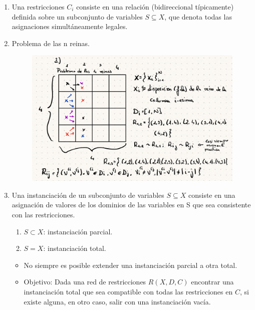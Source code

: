 \documentclass[12pt, twoside, openright]{report} %
\begin{document}
  
\begin{enumerate}
\def\labelenumi{\arabic{enumi}.}
\setcounter{enumi}{1}

\item
  Una restricciones \(C_i\) consiste en una relación (bidireccional
  típicamente) definida sobre un subconjunto de variables
  \(S \subseteq X\), que denota todas las asignaciones simultáneamente
  legales.

  \item
    Problema de las n reinas.
	\begin{figure}[H]
		{\includegraphics[scale=.25]{Untitled 35.png}}
	\end{figure}
  \item
    Una instanciación de un subconjunto de variables \(S \subseteq X\)
    consiste en una asignación de valores de los dominios de las
    variables en S que sea consistente con las restricciones.

    \begin{enumerate}
  
    \item
      \(S \subset X\): instanciación parcial.
	  \item
    \(S = X\): instanciación total.
    \end{enumerate}
  

    \begin{itemize}
  
    \item
      No siempre es posible extender una instanciación parcial a otra
      total.

	\item
	  Objetivo: Dada una red de restricciones \(R(X, D, C)\) encontrar una
	  instanciación total que sea compatible con todas las restricciones en
	  \(C\), si existe alguna, en otro caso, salir con una instanciación
	  vacía.
    \end{itemize}


\end{enumerate}
\end{document}
